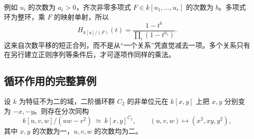 例如 \(u_i\) 的次数为 \(a_i>0\)，齐次非零多项式 \(F\in k[u_1,\ldots,u_r]\) 的次数为 \(b\)。多项式环为整环，乘 \(F\) 的映射单射，所以
\[
	H_{k[u]/(F)}(t)=\frac{1-t^b}{\prod_i(1-t^{a_i})}.
\]
这来自次数平移的短正合列，而不是从“一个关系”凭直觉减去一项。多个关系只有在另行建立正则序列等条件后，才可逐项作同样的乘法。

\subsection{循环作用的完整算例}
\label{b5:subsec:2204:04}

\begin{proposition}\label{b5:prop:sign-invariant-presentation}
	设 \(k\) 为特征不为二的域，二阶循环群 \(C_2\) 的非单位元在 \(k[x,y]\) 上把 \(x,y\) 分别变为 \(-x,-y\)。则存在分次同构
	\[
		k[u,v,w]/(uw-v^2)\ \simeq\ k[x,y]^{C_2}, \qquad (u,v,w)\longmapsto(x^2,xy,y^2),
	\]
	其中 \(x,y\) 的次数为一，\(u,v,w\) 的次数均为二。
\end{proposition}
